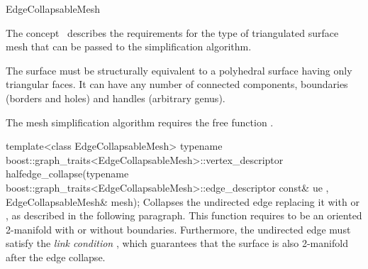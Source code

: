 
\begin{ccRefConcept}{EdgeCollapsableMesh}


\ccDefinition

The concept \ccRefName\ describes the requirements for the type of 
triangulated surface mesh that can be passed to the
simplification algorithm.

The surface must be structurally equivalent to a polyhedral surface
having only triangular faces. 
It can have any number of connected components, boundaries 
(borders and holes) and handles (arbitrary genus).

\ccRefines
{}


The mesh simplification algorithm requires the free function .

  \ccTagFullDeclarations
  \ccFunction
  {template<class EdgeCollapsableMesh>
  typename boost::graph_traits<EdgeCollapsableMesh>::vertex_descriptor
  halfedge_collapse(typename boost::graph_traits<EdgeCollapsableMesh>::edge_descriptor const& ue
                   , EdgeCollapsableMesh& mesh);
  }  
  {Collapses the undirected edge  replacing it with  or ,
  as described in the following paragraph.
  \ccPrecond This function requires  to be an oriented 2-manifold with or without boundaries. Furthermore, the undirected edge  must satisfy the {\em link 
  condition} \cite{degn-tpec-98}, which guarantees that the surface is also 2-manifold after the edge collapse. }


\end{ccRefConcept}
